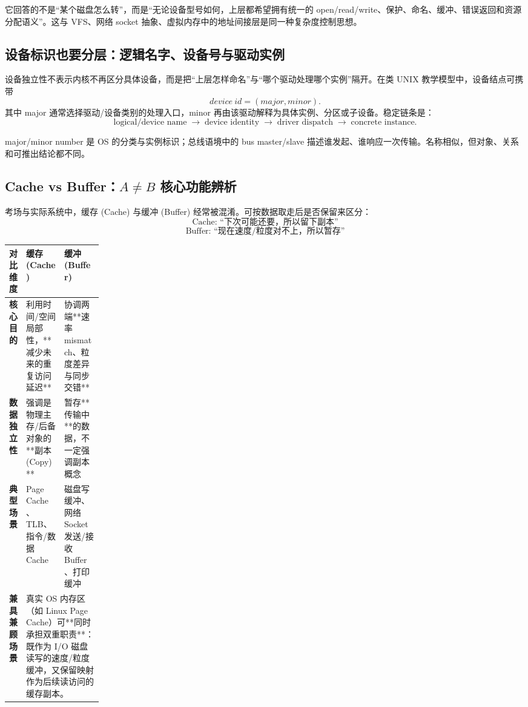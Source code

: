 \documentclass[UTF8,fontset=fandol,11pt,a4paper]{ctexart}
\newcommand{\arr}{\;\longrightarrow\;}
\begin{document}
\begin{exam}
它回答的不是“某个磁盘怎么转”，而是“无论设备型号如何，上层都希望拥有统一的 open/read/write、保护、命名、缓冲、错误返回和资源分配语义”。这与 VFS、网络 socket 抽象、虚拟内存中的地址间接层是同一种复杂度控制思想。
\end{exam}

\subsection{设备标识也要分层：逻辑名字、设备号与驱动实例}

设备独立性不表示内核不再区分具体设备，而是把“上层怎样命名”与“哪个驱动处理哪个实例”隔开。在类 UNIX 教学模型中，设备结点可携带
\[
\boxed{device\ id=(major,minor)}.
\]
其中 major 通常选择驱动/设备类别的处理入口，minor 再由该驱动解释为具体实例、分区或子设备。稳定链条是：
\[
\text{logical/device name}
\arr\text{device identity}
\arr\text{driver dispatch}
\arr\text{concrete instance}.
\]

\begin{warn}
major/minor number 是 OS 的分类与实例标识；总线语境中的 bus master/slave 描述谁发起、谁响应一次传输。名称相似，但对象、关系和可推出结论都不同。
\end{warn}

\subsection{Cache vs Buffer：\texorpdfstring{$A\neq B$}{A != B} 核心功能辨析}

考场与实际系统中，缓存 (Cache) 与缓冲 (Buffer) 经常被混淆。可按数据取走后是否保留来区分：
\[
\boxed{\text{Cache: “下次可能还要，所以留下副本”}}
\]
\[
\boxed{\text{Buffer: “现在速度/粒度对不上，所以暂存”}}
\]

\begingroup
\small
\renewcommand{\arraystretch}{1.25}
\setlength{\tabcolsep}{6pt}
\begin{tabularx}{\linewidth}{>{\bfseries}p{0.18\linewidth} X X}
\toprule
对比维度 & 缓存 (Cache) & 缓冲 (Buffer)\\
\midrule
核心目的 & 利用时间/空间局部性，**减少未来的重复访问延迟** & 协调两端**速率 mismatch、粒度差异与同步交错**\\
数据独立性 & 强调是物理主存/后备对象的**副本 (Copy)** & 暂存**传输中**的数据，不一定强调副本概念\\
典型场景 & Page Cache、TLB、指令/数据 Cache & 磁盘写缓冲、网络 Socket 发送/接收 Buffer、打印缓冲\\
兼具兼顾场景 & \multicolumn{2}{p{0.75\linewidth}}{真实 OS 内存区（如 Linux Page Cache）可**同时承担双重职责**：既作为 I/O 磁盘读写的速度/粒度缓冲，又保留映射作为后续读访问的缓存副本。}\\
\bottomrule
\end{tabularx}
\endgroup
\end{document}
